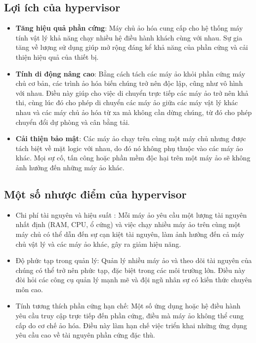 \documentclass[a4paper,12pt]{article}
\begin{document}
\subsection{ Lợi ích của hypervisor}
\begin{itemize}
\item \textbf{Tăng hiệu quả phần cứng}: Máy chủ ảo hóa cung cấp cho hệ thống máy tính vật lý khả năng chạy nhiều hệ
điều hành khách cùng với nhau. Sự gia tăng về lượng sử dụng giúp mở rộng đáng kể khả năng của phần cứng
và cải thiện hiệu quả của thiết bị.
\item \textbf{Tính di động nâng cao}: Bằng cách tách các máy ảo khỏi phần cứng máy chủ cơ bản, các trình ảo hóa biến
chúng trở nên độc lập, cũng như vô hình với nhau. Điều này giúp cho việc di chuyển trực tiếp các máy ảo trở
nên khả thi, cùng lúc đó cho phép di chuyển các máy ảo giữa các máy vật lý khác nhau và các máy chủ ảo
hóa từ xa mà không cần dừng chúng, từ đó cho phép chuyển đổi dự phòng và cân bằng tải.
\item \textbf{Cải thiện bảo mật}: Các máy ảo chạy trên cùng một máy chủ nhưng được tách biệt về mặt logic với nhau, do
đó nó không phụ thuộc vào các máy ảo khác. Mọi sự cố, tấn công hoặc phần mềm độc hại trên một máy ảo
sẽ không ảnh hưởng đến những máy ảo khác.
\end{itemize}


\subsection{ Một số nhược điểm của hypervisor}
\begin{itemize}
    \item Chi phí tài nguyên và hiệu suất : Mỗi máy ảo yêu cầu một lượng tài nguyên nhất định (RAM, CPU, ổ cứng) và việc chạy nhiều máy ảo trên cùng một máy chủ có thể dẫn đến sự cạn kiệt tài nguyên, làm ảnh hưởng đến cả máy chủ vật lý và các máy ảo khác, gây ra giảm hiệu năng.
    \item Độ phức tạp trong quản lý: Quản lý nhiều máy ảo và theo dõi tài nguyên của chúng có thể trở nên phức tạp, đặc biệt trong các môi trường lớn. Điều này đòi hỏi các công cụ quản lý mạnh mẽ và đội ngũ nhân sự có kiến thức chuyên môn cao.
    \item Tính tương thích phần cứng hạn chế: Một số ứng dụng hoặc hệ điều hành yêu cầu truy cập trực tiếp đến phần cứng, điều mà máy ảo không thể cung cấp do cơ chế ảo hóa. Điều này làm hạn chế việc triển khai những ứng dụng yêu cầu cao về tài nguyên phần cứng đặc thù.
\end{itemize}
\end{document}
